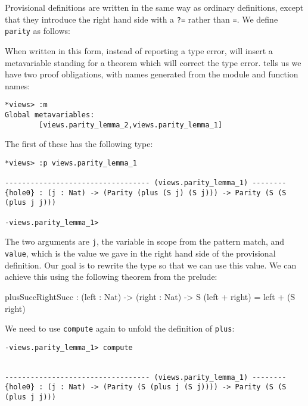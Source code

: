 \noindent
Provisional definitions are written in the same way as ordinary definitions, except that they introduce the right hand side with a \texttt{?=} rather than \texttt{=}.
We define \texttt{parity} as follows:


\noindent
When written in this form, instead of reporting a type error, \Idris{} will insert a metavariable standing for a theorem which will correct the type error.
\Idris{} tells us we have two proof obligations, with names generated from the module and function names:

\begin{lstlisting}[style=stdout]
*views> :m 
Global metavariables:
        [views.parity_lemma_2,views.parity_lemma_1]
\end{lstlisting}

\noindent
The first of these has the following type:

\begin{lstlisting}[style=stdout]
*views> :p views.parity_lemma_1 

---------------------------------- (views.parity_lemma_1) --------
{hole0} : (j : Nat) -> (Parity (plus (S j) (S j))) -> Parity (S (S (plus j j)))

-views.parity_lemma_1>  
\end{lstlisting}

\noindent
The two arguments are \texttt{j}, the variable in scope from the pattern match, and \texttt{value}, which is the value we gave in the right hand side of the provisional definition.
Our goal is to rewrite the type so that we can use this value.
We can achieve this using the following theorem from the prelude:

\begin{code}
plusSuccRightSucc : (left : Nat) -> (right : Nat) ->
  S (left + right) = left + (S right)
\end{code}

\noindent
We need to use \texttt{compute} again to unfold the definition of \texttt{plus}:

\begin{lstlisting}[style=stdout]
-views.parity_lemma_1> compute


---------------------------------- (views.parity_lemma_1) --------
{hole0} : (j : Nat) -> (Parity (S (plus j (S j)))) -> Parity (S (S (plus j j)))
\end{lstlisting}

